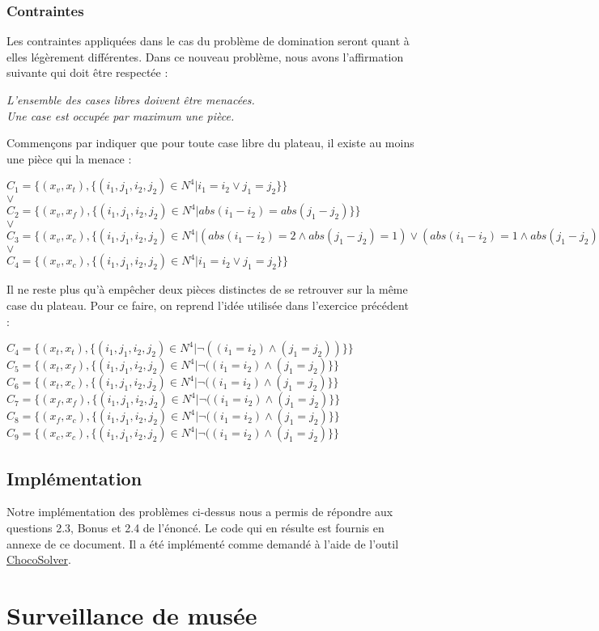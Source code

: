 \documentclass[a4paper]{article}
\begin{document}
\subsubsection{Contraintes}
Les contraintes appliquées dans le cas du problème de domination seront quant à elles légèrement différentes. Dans ce nouveau problème, nous avons l'affirmation suivante qui doit être respectée :
\begin{center}
\textit{L'ensemble des cases libres doivent être menacées.} \vspace{0.1cm} \\
\textit{Une case est occupée par maximum une pièce.}
\end{center}
Commençons par indiquer que pour toute case libre du plateau, il existe au moins une pièce qui la menace : 
\begin{center}
$C_1 = \{ (x_v,x_t), \{ (i_1,j_1,i_2,j_2) \in N^4 | i_1 = i_2 \vee j_1 = j_2 \} \}$ \\
$\vee$ \\
$C_2 = \{ (x_v,x_f), \{ (i_1,j_1,i_2,j_2) \in N^4 | abs(i_1 - i_2) = abs(j_1 - j_2) \} \}$ \\
$\vee$ \\
$C_3 = \{ (x_v,x_c), \{ (i_1,j_1,i_2,j_2) \in N^4 | (abs(i_1 - i_2) = 2 \wedge abs(j_1 - j_2) = 1) \vee (abs(i_1 - i_2) = 1 \wedge abs(j_1 - j_2)) = 2 \} \}$ \\
$\vee$ \\
$C_4 = \{ (x_v,x_c), \{ (i_1,j_1,i_2,j_2) \in N^4 | i_1 = i_2 \vee j_1 = j_2 \} \}$
\end{center}
Il ne reste plus qu'à empêcher deux pièces distinctes de se retrouver sur la même case du plateau. Pour ce faire, on reprend l'idée utilisée dans l'exercice précédent : 
\begin{center}
$C_4 = \{ (x_t,x_t), \{ (i_1,j_1,i_2,j_2) \in N^4 | \neg((i_1 = i_2) \wedge (j_1 = j_2)) \} \}$
$C_5 = \{ (x_t,x_f), \{ (i_1,j_1,i_2,j_2) \in N^4 | \neg((i_1 = i_2) \wedge (j_1 = j_2) \} \}$
$C_6 = \{ (x_t,x_c), \{ (i_1,j_1,i_2,j_2) \in N^4 | \neg((i_1 = i_2) \wedge (j_1 = j_2)\} \}$
$C_7 = \{ (x_f,x_f), \{ (i_1,j_1,i_2,j_2) \in N^4 | \neg((i_1 = i_2) \wedge (j_1 = j_2)\} \}$
$C_8 = \{ (x_f,x_c), \{ (i_1,j_1,i_2,j_2) \in N^4 | \neg((i_1 = i_2) \wedge (j_1 = j_2)\} \}$
$C_9 = \{ (x_c,x_c), \{ (i_1,j_1,i_2,j_2) \in N^4 | \neg((i_1 = i_2) \wedge (j_1 = j_2)\} \}$
\end{center}

\subsection{Implémentation}
Notre implémentation des problèmes ci-dessus nous a permis de répondre aux questions 2.3, Bonus et 2.4 de l'énoncé. Le code qui en résulte est fournis en annexe de ce document. Il a été implémenté comme demandé à l'aide de l'outil \href{http://www.choco-solver.org/}{ChocoSolver}.

\section{Surveillance de musée}
\end{document}
